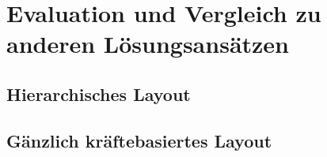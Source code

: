 \documentclass[a4paper, oneside]{scrartcl}
\begin{document}






\section{Evaluation und Vergleich zu anderen Lösungsansätzen}
\subsection{Hierarchisches Layout}
\subsection{Gänzlich kräftebasiertes Layout} %
\end{document}

